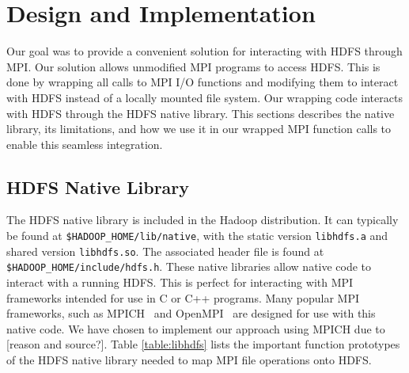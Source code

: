 

\section{Design and Implementation}
Our goal was to provide a convenient solution for interacting with HDFS through MPI. Our solution allows unmodified MPI programs to access HDFS. This is done by wrapping all calls to MPI I/O functions and modifying them to interact with HDFS instead of a locally mounted file system. Our wrapping code interacts with HDFS through the HDFS native library. This sections describes the native library, its limitations, and how we use it in our wrapped MPI function calls to enable this seamless integration.

\subsection{HDFS Native Library}
The HDFS native library is included in the Hadoop distribution. It can typically be found at \texttt{\$HADOOP\_HOME/lib/native}, with the static version \texttt{libhdfs.a} and shared version \texttt{libhdfs.so}. The associated header file is found at \texttt{\$HADOOP\_HOME/include/hdfs.h}. These native libraries allow native code to interact with a running HDFS. This is perfect for interacting with MPI frameworks intended for use in C or C++ programs. Many popular MPI frameworks, such as MPICH~\cite{mpich} and OpenMPI~\cite{openmpi} are designed for use with this native code. We have chosen to implement our approach using MPICH due to [reason and source?]. Table \ref{table:libhdfs} lists the important function prototypes of the HDFS native library needed to map MPI file operations onto HDFS.

